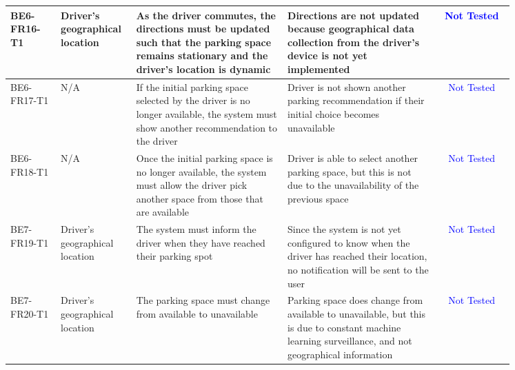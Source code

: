 \documentclass[12pt, titlepage]{article}
\begin{document}
\begin{center}
\begin{tabular}{|p{0.10\linewidth}|p{0.15\linewidth}|p{0.30\linewidth}|p{0.30\linewidth}|c|} 
\hline
BE6-FR16-T1 & Driver’s geographical location & As the driver commutes, the
directions must be updated such that the parking space remains stationary and
the driver’s location is dynamic & Directions are not updated because
geographical data collection from the driver's device is not yet implemented &
\textcolor{blue}{Not Tested} \\ 
\hline
BE6-FR17-T1 & N/A & If the initial parking space selected by the driver is no
longer available, the system must show another recommendation to the driver &
Driver is not shown another parking recommendation if their initial choice
becomes unavailable & \textcolor{blue}{Not Tested} \\ 
\hline
BE6-FR18-T1 & N/A & Once the initial parking space is no longer available, the
system must allow the driver pick another space from those that are available &
Driver is able to select another parking space, but this is not due to the
unavailability of the previous space & \textcolor{blue}{Not Tested} \\ 
\hline
BE7-FR19-T1 & Driver’s geographical location & The system must inform the driver
when they have reached their parking spot & Since the system is not yet
configured to know when the driver has reached their location, no notification
will be sent to the user & \textcolor{blue}{Not Tested} \\ 
\hline
BE7-FR20-T1 & Driver’s geographical location & The parking space must change
from available to unavailable & Parking space does change from available to
unavailable, but this is due to constant machine learning surveillance, and not
geographical information & \textcolor{blue}{Not Tested} \\ 
\hline
\end{tabular}
\end{center}
\end{document}
